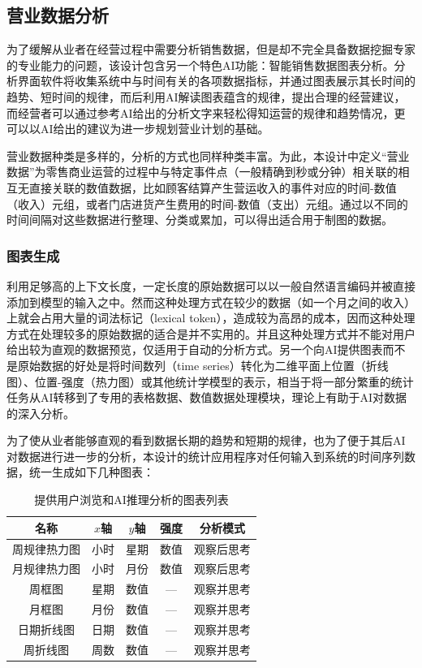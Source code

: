 \subsection{营业数据分析}

为了缓解从业者在经营过程中需要分析销售数据，但是却不完全具备数据挖掘专家的专业能力的问题，该设计包含另一个特色AI功能：智能销售数据图表分析。分析界面软件将收集系统中与时间有关的各项数据指标，并通过图表展示其长时间的趋势、短时间的规律，而后利用AI解读图表蕴含的规律，提出合理的经营建议，而经营者可以通过参考AI给出的分析文字来轻松得知运营的规律和趋势情况，更可以以AI给出的建议为进一步规划营业计划的基础。

营业数据种类是多样的，分析的方式也同样种类丰富。为此，本设计中定义“营业数据”为零售商业运营的过程中与特定事件点（一般精确到秒或分钟）相关联的相互无直接关联的数值数据，比如顾客结算产生营运收入的事件对应的时间-数值（收入）元组，或者门店进货产生费用的时间-数值（支出）元组。通过以不同的时间间隔对这些数据进行整理、分类或累加，可以得出适合用于制图的数据。

\subsubsection{图表生成}

利用足够高的上下文长度，一定长度的原始数据可以以一般自然语言编码并被直接添加到模型的输入之中。然而这种处理方式在较少的数据（如一个月之间的收入）上就会占用大量的词法标记（lexical token），造成较为高昂的成本，因而这种处理方式在处理较多的原始数据的适合是并不实用的。并且这种处理方式并不能对用户给出较为直观的数据预览，仅适用于自动的分析方式。另一个向AI提供图表而不是原始数据的好处是将时间数列（time series）转化为二维平面上位置（折线图）、位置-强度（热力图）或其他统计学模型的表示，相当于将一部分繁重的统计任务从AI转移到了专用的表格数据、数值数据处理模块，理论上有助于AI对数据的深入分析。

为了使从业者能够直观的看到数据长期的趋势和短期的规律，也为了便于其后AI对数据进行进一步的分析，本设计的统计应用程序对任何输入到系统的时间序列数据，统一生成如下几种图表：

\begin{table}[htbp]
    \centering
    \begin{tabular}{|c|c|c|c|c|}
        \hline
        名称 & $x$轴 & $y$轴 & 强度 & 分析模式\\
        \hline
        周规律热力图 & 小时 & 星期 & 数值 & 观察后思考 \\
        \hline
        月规律热力图 & 小时 & 月份 & 数值 & 观察后思考 \\
        \hline
        周框图 & 星期 & 数值 & --- & 观察并思考 \\
        \hline
        月框图 & 月份 & 数值 & --- & 观察并思考 \\
        \hline
        日期折线图 & 日期 & 数值 & --- & 观察并思考 \\
        \hline
        周折线图 & 周数 & 数值 & --- & 观察并思考 \\
        \hline
    \end{tabular}
    \caption{提供用户浏览和AI推理分析的图表列表}
	\label{tab:graphs}
\end{table}


